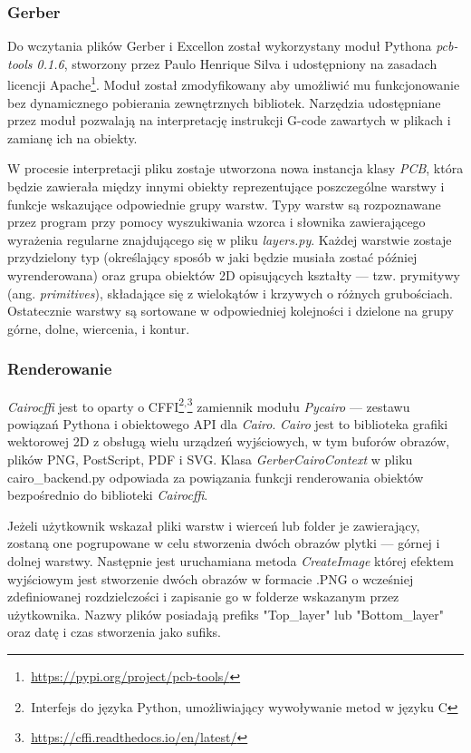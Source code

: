 \documentclass[brudnopis]{xmgr}
\begin{document}
\subsubsection{Gerber}
Do wczytania plików Gerber i Excellon został wykorzystany moduł Pythona \emph{pcb-tools 0.1.6}, stworzony przez Paulo Henrique Silva i udostępniony na zasadach licencji Apache\footnote{\,\url{https://pypi.org/project/pcb-tools/}}. Moduł został zmodyfikowany aby umożliwić mu funkcjonowanie bez dynamicznego pobierania zewnętrznych bibliotek. Narzędzia udostępniane przez moduł pozwalają na interpretację instrukcji G-code zawartych w plikach i zamianę ich na obiekty.

W procesie interpretacji pliku zostaje utworzona nowa instancja klasy \emph{PCB}, która będzie zawierała między innymi obiekty reprezentujące poszczególne warstwy i funkcje wskazujące odpowiednie grupy warstw. Typy warstw są rozpoznawane przez program przy pomocy wyszukiwania wzorca i słownika zawierającego wyrażenia regularne znajdującego się w pliku \emph{layers.py}. Każdej warstwie zostaje przydzielony typ (określający sposób w jaki będzie musiała zostać później wyrenderowana) oraz grupa obiektów 2D opisujących kształty --- tzw. prymitywy (ang. \emph{primitives}), składające się z wielokątów i krzywych o różnych grubościach. Ostatecznie warstwy są sortowane w odpowiedniej kolejności i dzielone na grupy górne, dolne, wiercenia, i kontur.

\subsubsection{Renderowanie}
\emph{Cairocffi} jest to oparty o CFFI\footnote{\,Interfejs do języka Python, umożliwiający wywoływanie metod w języku C}$^{,}$\footnote{\,\url{https://cffi.readthedocs.io/en/latest/}} zamiennik modułu \emph{Pycairo} --- zestawu powiązań Pythona i obiektowego API dla \emph{Cairo}. \emph{Cairo} jest to biblioteka grafiki wektorowej 2D z obsługą wielu urządzeń wyjściowych, w tym buforów obrazów, plików PNG, PostScript, PDF i SVG. 
Klasa \emph{GerberCairoContext} w pliku cairo\_backend.py odpowiada za powiązania funkcji renderowania obiektów bezpośrednio do biblioteki \emph{Cairocffi}.

Jeżeli użytkownik wskazał pliki warstw i wierceń lub folder je zawierający, zostaną one pogrupowane w celu stworzenia dwóch obrazów plytki --- górnej i dolnej warstwy. Następnie jest uruchamiana metoda \emph{CreateImage} której efektem wyjściowym jest stworzenie dwóch obrazów w formacie .PNG o wcześniej zdefiniowanej rozdzielczości i zapisanie go w folderze wskazanym przez użytkownika. Nazwy plików posiadają prefiks "Top\_layer" lub "Bottom\_layer" oraz datę i czas stworzenia jako sufiks. 
\end{document}
